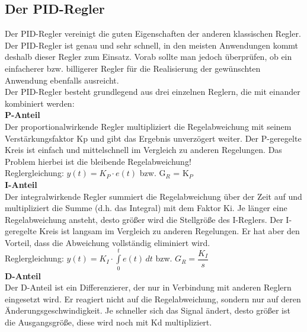 \subsection{Der PID-Regler}
Der PID-Regler vereinigt die guten Eigenschaften der anderen klassischen Regler. Der PID-Regler ist genau und sehr schnell, in den meisten Anwendungen kommt deshalb dieser Regler zum Einsatz. Vorab sollte man jedoch überprüfen, ob ein einfacherer bzw. billigerer Regler für die Realisierung der gewünschten Anwendung ebenfalls ausreicht.
\\[5mm]
Der PID-Regler besteht grundlegend aus drei einzelnen Reglern, die mit einander kombiniert werden:
\\[5mm]
\textbf{P-Anteil}\\[1mm]
Der proportionalwirkende Regler multipliziert die Regelabweichung mit seinem Verstärkungsfaktor Kp und gibt das Ergebnis unverzögert weiter. Der P-geregelte Kreis ist einfach und mittelschnell im Vergleich zu anderen Regelungen. Das Problem hierbei ist die bleibende Regelabweichung!
\\[4mm]
Reglergleichung: \hspace{5mm} $y(t) = K_P \cdot e(t)$ \hspace{5mm} bzw. \hspace{5mm} G$_R$ = K$_P$
\\[7mm]

\textbf{I-Anteil}\\[1mm]
Der integralwirkende Regler summiert die Regelabweichung über der Zeit auf und multipliziert die Summe (d.h. das Integral) mit dem Faktor Ki. Je länger eine Regelabweichung ansteht, desto größer wird die Stellgröße des I-Reglers. Der I-geregelte Kreis ist langsam im Vergleich zu anderen Regelungen. Er hat aber den Vorteil, dass die Abweichung vollständig eliminiert wird.
\\[4mm]
Reglergleichung: \hspace{5mm} $y(t) = K_I \cdot \int\limits_{0}^{t} e(t) \,dt$ \hspace{5mm} bzw. \hspace{5mm} $G_R = \dfrac{K_I}{s}$
\\[7mm]

\textbf{D-Anteil}\\[1mm]
Der D-Anteil ist ein Differenzierer, der nur in Verbindung mit anderen Reglern eingesetzt wird. Er reagiert nicht auf die Regelabweichung, sondern nur auf deren Änderungsgeschwindigkeit. Je schneller sich das Signal ändert, desto größer ist die Ausgangsgröße, diese wird noch mit Kd multipliziert.

